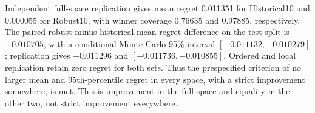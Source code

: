 Independent full-space replication gives mean regret 0.011351 for Historical10 and 0.000055 for Robust10, with winner coverage 0.76635 and 0.97885, respectively. The paired robust-minus-historical mean regret difference on the test split is $-0.010705$, with a conditional Monte Carlo 95\% interval $[-0.011132,-0.010279]$; replication gives $-0.011296$ and $[-0.011736,-0.010855]$. Ordered and local replication retain zero regret for both sets. Thus the prespecified criterion of no larger mean and 95th-percentile regret in every space, with a strict improvement somewhere, is met. This is improvement in the full space and equality in the other two, not strict improvement everywhere.
